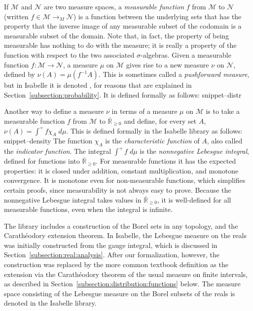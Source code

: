 \documentclass{svjour3}
\newcommand{\ennRR}{\overline{\mathbb{R}}_{\ge 0}}
\newcommand{\mdl}[1]{{\mathcal #1}} %
\newcommand{\Snippet}[1]{\csname snippet--#1\endcsname}
\begin{document}
If $\mdl M$ and $\mdl N$ are two measure spaces, a \emph{measurable function} $f$ from $\mdl M$ to $\mdl N$ (written $f \in \mdl{M} \rightarrow_M \mdl{N}$) is a function between the underlying sets that has the property that the inverse image of any measurable subset of the codomain is a measurable subset of the domain. Note that, in fact, the property of being measurable has nothing to do with the measure; it is really a property of the function with respect to the two associated $\sigma$-algebras. Given a measurable function $f : \mdl M \to \mdl N$, a measure $\mu$ on $\mdl M$ gives rise to a new measure $\nu$ on $\mdl N$, defined by $\nu(A) = \mu(f^{-1} A)$. This is sometimes called a \emph{pushforward measure}, but in Isabelle it is denoted , for reasons that are explained in Section~\ref{subsection:probability}. It is defined formally as follows:
\Snippet{distr}

Another way to define a measure $\nu$ in terms of a measure $\mu$ on $\mdl M$ is to take a measurable function $f$ from $\mdl M$ to $\ennRR$ and define, for every set $A$, $\nu(A) = \int^+ f \chi_A \; d\mu$. This is defined formally in the Isabelle library as follows:
\Snippet{density}
The function $\chi_A$ is the \emph{characteristic function} of $A$, also called the \emph{indicator function}. The integral $\int^+ f \; d\mu$ is the \emph{nonnegative Lebesgue integral}, defined for functions into $\ennRR$. For measurable functions it has the expected properties: it is closed under addition, constant multiplication, and monotone convergence. It is monotone even for non-measurable functions, which simplifies certain proofs, since measurability is not always easy to prove. Because the nonnegative Lebesgue integral takes values in $\ennRR$, it is well-defined for all measurable functions, even when the integral is infinite.

The library includes a construction of the Borel sets in any topology, and the Carath\'eodory extension theorem. In Isabelle, the Lebesgue measure on the reals was initially constructed from the gauge integral, which is discussed in Section~\ref{subsection:real:analysis}. After our formalization, however, the construction was replaced by the more common textbook definition as the extension via the Carath\'eodory theorem of the usual measure on finite intervals, as described in Section~\ref{subsection:distribution:functions} below. The measure space consisting of the Lebesgue measure on the Borel subsets of the reals is denoted  in the Isabelle library.
\end{document}
